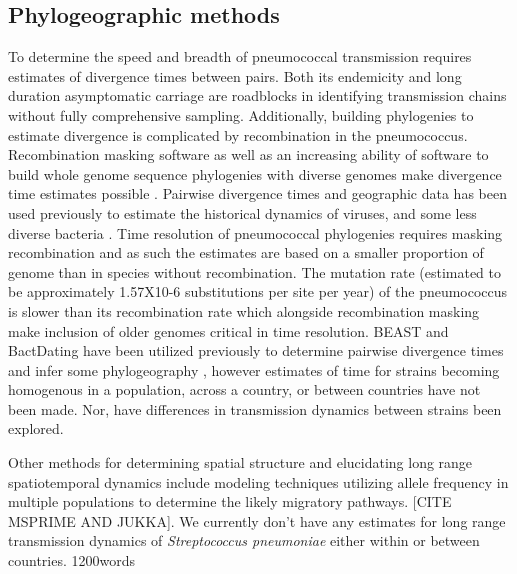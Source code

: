 \documentclass{article}
\begin{document}
\subsection{Phylogeographic methods} 
To  determine the speed and breadth of pneumococcal transmission requires estimates of divergence times between pairs.  Both its endemicity and long duration asymptomatic carriage are roadblocks in identifying transmission chains without fully comprehensive sampling. Additionally, building phylogenies to estimate divergence is complicated by recombination in the pneumococcus. Recombination masking software as well as an increasing ability of software to build whole genome sequence phylogenies with diverse genomes make divergence time estimates possible \cite{croucherRapidPhylogeneticAnalysis2015,didelotBayesianInferenceAncestral2018,drummondBayesianEvolutionaryAnalysis2015}. Pairwise divergence times and geographic data has been used previously to estimate the historical dynamics of viruses, and some less diverse bacteria \cite{allicockPhylogeographyPopulationDynamics2012, okoroIntracontinentalSpreadHuman2012,mutrejaEvidenceSeveralWaves2011, lemeyBayesianPhylogeographyFinds2009a}. Time resolution of pneumococcal phylogenies requires masking  recombination and as such the estimates are based on a smaller proportion of genome than in species without recombination. The mutation rate (estimated to be approximately 1.57X10-6 substitutions per site per year) of the pneumococcus is slower than its recombination rate\cite{croucherRapidPneumococcalEvolution2011} which alongside recombination masking make inclusion of older genomes critical in time resolution. BEAST and BactDating have been utilized previously to determine pairwise divergence times and infer some phylogeography  \cite{cornickRegionspecificDiversificationHighly2015}, however estimates of time for strains becoming homogenous in a population, across a country, or between countries have not been made. Nor, have differences in transmission dynamics between strains been explored. 


Other methods for determining spatial structure and elucidating long range spatiotemporal dynamics include modeling techniques utilizing allele frequency in multiple populations to determine the likely migratory pathways. [CITE MSPRIME AND JUKKA].
We currently don't have any estimates for long range transmission dynamics of \textit{Streptococcus pneumoniae} either within or between countries. 
1200words
\end{document}
